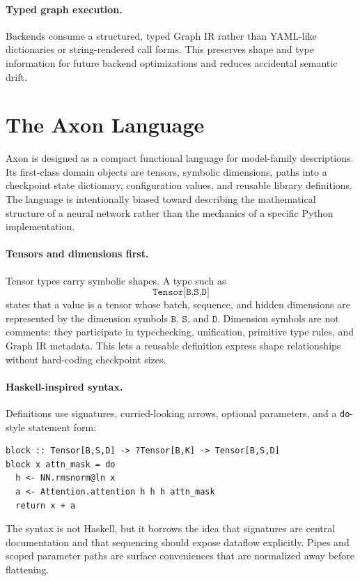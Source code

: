 \documentclass{article}
\newcommand{\code}[1]{\texttt{#1}}
\begin{document}
\paragraph{Typed graph execution.}
Backends consume a structured, typed Graph IR rather than YAML-like dictionaries
or string-rendered call forms.  This preserves shape and type information for
future backend optimizations and reduces accidental semantic drift.

\section{The Axon Language}

Axon is designed as a compact functional language for model-family
descriptions.  Its first-class domain objects are tensors, symbolic dimensions,
paths into a checkpoint state dictionary, configuration values, and reusable
library definitions.  The language is intentionally biased toward describing
the mathematical structure of a neural network rather than the mechanics of a
specific Python implementation.

\paragraph{Tensors and dimensions first.}
Tensor types carry symbolic shapes.  A type such as
\[
  \code{Tensor[B,S,D]}
\]
states that a value is a tensor whose batch, sequence, and hidden dimensions
are represented by the dimension symbols \(\code{B}\), \(\code{S}\), and
\(\code{D}\).  Dimension symbols are not comments: they participate in
typechecking, unification, primitive type rules, and Graph IR metadata.  This
lets a reusable definition express shape relationships without hard-coding
checkpoint sizes.

\paragraph{Haskell-inspired syntax.}
Definitions use signatures, curried-looking arrows, optional parameters, and a
\code{do}-style statement form:
\begin{verbatim}
block :: Tensor[B,S,D] -> ?Tensor[B,K] -> Tensor[B,S,D]
block x attn_mask = do
  h <- NN.rmsnorm@ln x
  a <- Attention.attention h h h attn_mask
  return x + a
\end{verbatim}
The syntax is not Haskell, but it borrows the idea that signatures are central
documentation and that sequencing should expose dataflow explicitly.  Pipes
and scoped parameter paths are surface conveniences that are normalized away
before flattening.
\end{document}
